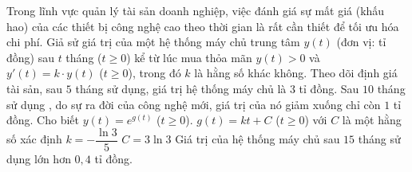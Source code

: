 \begin{ex}
 Trong lĩnh vực quản lý tài sản doanh nghiệp, việc đánh giá sự mất giá (khấu hao) của các thiết bị công nghệ cao theo thời gian là rất cần thiết để tối ưu hóa chi phí. Giả sử giá trị của một hệ thống máy chủ trung tâm $y(t)$ (đơn vị: tỉ đồng) sau $t$ tháng ($t \ge 0$) kể từ lúc mua thỏa mãn $y(t) > 0$ và $y'(t) = k \cdot y(t)$ ($t \ge 0$), trong đó $k$ là hằng số khác không. Theo dõi định giá tài sản, sau $5$ tháng sử dụng, giá trị hệ thống máy chủ là $3$ tỉ đồng. Sau $10$ tháng sử dụng , do sự ra đời của công nghệ mới, giá trị của nó giảm xuống chỉ còn $1$ tỉ đồng. Cho biết $y(t) = e^{g(t)}$ ($t \ge 0$).
 \choiceTF
 {\True $g(t) = kt + C$ ($t \ge 0$) với $C$ là một hằng số xác định}
 {\True $k = -\dfrac{\ln 3}{5}$}
 {$C = 3\ln 3$}
 {Giá trị của hệ thống máy chủ sau $15$ tháng sử dụng lớn hơn $0{,}4$ tỉ đồng.}
\end{ex}

